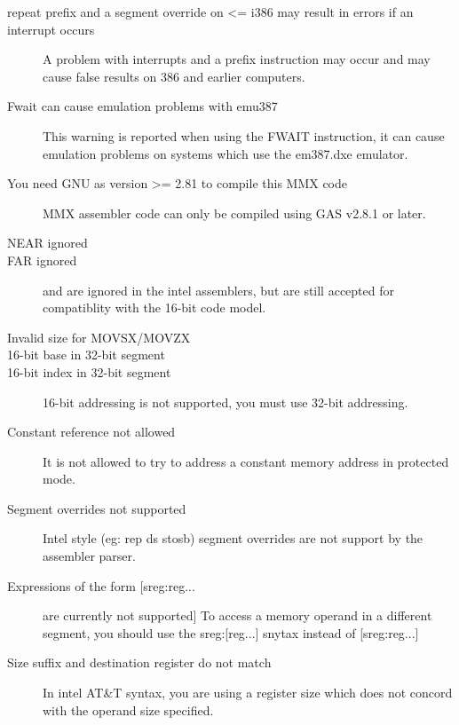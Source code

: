 \documentclass{report}
\begin{document}
\begin{description}
\item [repeat prefix and a segment override on <= i386 may result in errors if an interrupt occurs]
A problem with interrupts and a prefix instruction may occur and may cause
false results on 386 and earlier computers.

\item [Fwait can cause emulation problems with emu387]
This warning is reported when using the FWAIT instruction, it can
cause emulation problems on systems which use the em387.dxe emulator.

\item [You need GNU as version >= 2.81 to compile this MMX code]
MMX assembler code can only be compiled using GAS v2.8.1 or later.

\item [NEAR ignored]
\item [FAR ignored]
\label{FarIgnored}
 and  are ignored in the intel assemblers, but are still accepted
for compatiblity with the 16-bit code model.

\item [Invalid size for MOVSX/MOVZX]

\item [16-bit base in 32-bit segment]
\item [16-bit index in 32-bit segment]
16-bit addressing is not supported, you must use 32-bit addressing.


\item [Constant reference not allowed]
It is not allowed to try to address a constant memory address in protected
mode.

\item [Segment overrides not supported]
Intel style (eg: rep ds stosb) segment overrides are not support by
the assembler parser.

\item [Expressions of the form [sreg:reg...] are currently not supported]
To access a memory operand in a different segment, you should use the
sreg:[reg...] snytax instead of [sreg:reg...]

\item [Size suffix and destination register do not match]
In intel AT\&T syntax, you are using a register size which does
not concord with the operand size specified.


\end{description}
\end{document}
